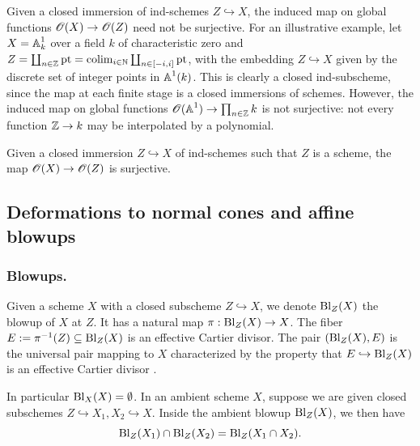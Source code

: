 \begin{remark}
    Given a closed immersion of ind-schemes $Z \hookrightarrow X$, the induced map on global functions $\operatorname{\mathscr{O}}(X) \to \operatorname{\mathscr{O}}(Z)$ need not be surjective. For an illustrative example, let $X = \operatorname{\mathbb{A}}^1_k$ over a field $k$ of characteristic zero and $Z = \coprod_{n \in \operatorname{\mathbb{Z}}} \operatorname{pt} = \operatorname*{colim}_{i \in \operatorname{\mathbb{N}}} \coprod_{n \in [-i, i] } \operatorname{pt}$, with the embedding $Z \hookrightarrow X$ given by the discrete set of integer points in $\operatorname{\mathbb{A}}^1(k)$. This is clearly a closed ind-subscheme, since the map at each finite stage is a closed immersions of schemes. However, the induced map on global functions $\operatorname{\mathscr{O}}(\operatorname{\mathbb{A}}^{1}) \to \prod_{n \in \operatorname{\mathbb{Z}}} k$ is not surjective: not every function $\operatorname{\mathbb{Z}} \to k$ may be interpolated by a polynomial.

    Given a closed immersion $Z \hookrightarrow X$ of ind-schemes such that $Z$ is a scheme, the map $\operatorname{\mathscr{O}}(X) \to \operatorname{\mathscr{O}}(Z)$ is surjective. 
\end{remark}






\subsection{Deformations to normal cones and affine blowups}\label{section: deformations to normal cones and affine blowups}


\subsubsection{Blowups.}\label{section: blowups}
Given a scheme $X$ with a closed subscheme $Z \hookrightarrow X$, we denote $\operatorname{Bl}_Z(X)$ the blowup of $X$ at $Z$. It has a natural map $\pi: \operatorname{Bl}_Z(X) \to X$. The fiber $E:=\pi^{-1}(Z) \subseteq \operatorname{Bl}_Z(X)$ is an effective Cartier divisor. The pair $(\operatorname{Bl}_Z(X), E)$ is the universal pair mapping to $X$ characterized by the property that $E \hookrightarrow \operatorname{Bl}_Z(X)$ is an effective Cartier divisor \cite[Tag 085U]{Sta}.

In particular $\operatorname{Bl}_X(X) = \emptyset$. In an ambient scheme $X$, suppose we are given closed subschemes $Z \hookrightarrow X_1, X_2 \hookrightarrow X$. Inside the ambient blowup $\operatorname{Bl}_Z(X)$, we then have
\begin{equation*}
    \operatorname{Bl}_{Z}(X_1) \cap \operatorname{Bl}_{Z}(X_2) = \operatorname{Bl}_{Z}(X_1 \cap X_2).
\end{equation*}


